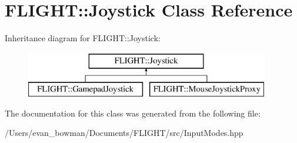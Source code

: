 \hypertarget{class_f_l_i_g_h_t_1_1_joystick}{}\section{F\+L\+I\+G\+HT\+:\+:Joystick Class Reference}
\label{class_f_l_i_g_h_t_1_1_joystick}
Inheritance diagram for F\+L\+I\+G\+HT\+:\+:Joystick\+:\begin{figure}[H]
\begin{center}
\leavevmode
\includegraphics[height=2.000000cm]{class_f_l_i_g_h_t_1_1_joystick}
\end{center}
\end{figure}


The documentation for this class was generated from the following file\+:\begin{DoxyCompactItemize}
\item 
/\+Users/evan\+\_\+bowman/\+Documents/\+F\+L\+I\+G\+H\+T/src/Input\+Modes.\+hpp\end{DoxyCompactItemize}
